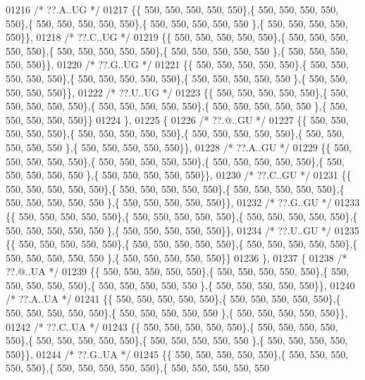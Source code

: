 \begin{DoxyCode}
01216 \textcolor{comment}{/* ??.A..UG */}
01217 \{\{ 550, 550, 550, 550, 550\},\{ 550, 550, 550, 550, 550\},\{ 550, 550, 550, 550, 550\},\{ 550, 550, 550, 550, 550
      \},\{ 550, 550, 550, 550, 550\}\},
01218 \textcolor{comment}{/* ??.C..UG */}
01219 \{\{ 550, 550, 550, 550, 550\},\{ 550, 550, 550, 550, 550\},\{ 550, 550, 550, 550, 550\},\{ 550, 550, 550, 550, 550
      \},\{ 550, 550, 550, 550, 550\}\},
01220 \textcolor{comment}{/* ??.G..UG */}
01221 \{\{ 550, 550, 550, 550, 550\},\{ 550, 550, 550, 550, 550\},\{ 550, 550, 550, 550, 550\},\{ 550, 550, 550, 550, 550
      \},\{ 550, 550, 550, 550, 550\}\},
01222 \textcolor{comment}{/* ??.U..UG */}
01223 \{\{ 550, 550, 550, 550, 550\},\{ 550, 550, 550, 550, 550\},\{ 550, 550, 550, 550, 550\},\{ 550, 550, 550, 550, 550
      \},\{ 550, 550, 550, 550, 550\}\}
01224 \},
01225 \{
01226 \textcolor{comment}{/* ??.@..GU */}
01227 \{\{ 550, 550, 550, 550, 550\},\{ 550, 550, 550, 550, 550\},\{ 550, 550, 550, 550, 550\},\{ 550, 550, 550, 550, 550
      \},\{ 550, 550, 550, 550, 550\}\},
01228 \textcolor{comment}{/* ??.A..GU */}
01229 \{\{ 550, 550, 550, 550, 550\},\{ 550, 550, 550, 550, 550\},\{ 550, 550, 550, 550, 550\},\{ 550, 550, 550, 550, 550
      \},\{ 550, 550, 550, 550, 550\}\},
01230 \textcolor{comment}{/* ??.C..GU */}
01231 \{\{ 550, 550, 550, 550, 550\},\{ 550, 550, 550, 550, 550\},\{ 550, 550, 550, 550, 550\},\{ 550, 550, 550, 550, 550
      \},\{ 550, 550, 550, 550, 550\}\},
01232 \textcolor{comment}{/* ??.G..GU */}
01233 \{\{ 550, 550, 550, 550, 550\},\{ 550, 550, 550, 550, 550\},\{ 550, 550, 550, 550, 550\},\{ 550, 550, 550, 550, 550
      \},\{ 550, 550, 550, 550, 550\}\},
01234 \textcolor{comment}{/* ??.U..GU */}
01235 \{\{ 550, 550, 550, 550, 550\},\{ 550, 550, 550, 550, 550\},\{ 550, 550, 550, 550, 550\},\{ 550, 550, 550, 550, 550
      \},\{ 550, 550, 550, 550, 550\}\}
01236 \},
01237 \{
01238 \textcolor{comment}{/* ??.@..UA */}
01239 \{\{ 550, 550, 550, 550, 550\},\{ 550, 550, 550, 550, 550\},\{ 550, 550, 550, 550, 550\},\{ 550, 550, 550, 550, 550
      \},\{ 550, 550, 550, 550, 550\}\},
01240 \textcolor{comment}{/* ??.A..UA */}
01241 \{\{ 550, 550, 550, 550, 550\},\{ 550, 550, 550, 550, 550\},\{ 550, 550, 550, 550, 550\},\{ 550, 550, 550, 550, 550
      \},\{ 550, 550, 550, 550, 550\}\},
01242 \textcolor{comment}{/* ??.C..UA */}
01243 \{\{ 550, 550, 550, 550, 550\},\{ 550, 550, 550, 550, 550\},\{ 550, 550, 550, 550, 550\},\{ 550, 550, 550, 550, 550
      \},\{ 550, 550, 550, 550, 550\}\},
01244 \textcolor{comment}{/* ??.G..UA */}
01245 \{\{ 550, 550, 550, 550, 550\},\{ 550, 550, 550, 550, 550\},\{ 550, 550, 550, 550, 550\},\{ 550, 550, 550, 550, 550

\end{DoxyCode}
